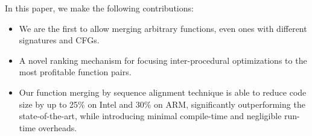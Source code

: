 In this paper, we make the following contributions:
\begin{itemize}[noitemsep,topsep=3pt]
  \item We are the first to allow merging arbitrary functions, even ones with
    different signatures and CFGs.
  \item A novel ranking mechanism for focusing inter-procedural optimizations
    to the most profitable function pairs.
  \item Our function merging by sequence alignment technique is able to reduce
     code size by up to 25\% on Intel and 30\% on ARM, significantly outperforming the
    state-of-the-art, while introducing minimal compile-time and negligible run-time overheads.
\end{itemize}





